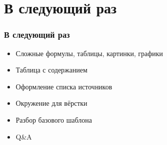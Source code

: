\section{В следующий раз}

\begin{frame}

\frametitle{В следующий раз}

\begin{itemize}
    \item Сложные формулы, таблицы, картинки, графики
    \item Таблица с содержанием
    \item Оформление списка источников
    \item Окружение для вёрстки
    \item Разбор базового шаблона
    \item Q\&A
\end{itemize}

\end{frame}

